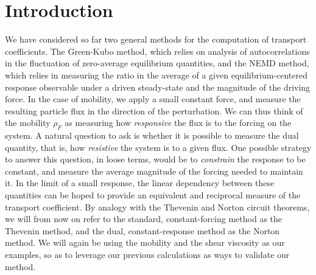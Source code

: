 \section{Introduction}
We have considered so far two general methods for the computation of transport coefficients. The Green-Kubo method, which relies on analysis of autocorrelations in the fluctuation of zero-average equilibrium quantities, 
and the NEMD method, which relies in measuring the ratio in the average of a given equilibrium-centered response observable under a driven steady-state and the magnitude of the driving force.
In the case of mobility, we apply a small constant force, and measure the resulting particle flux in the direction of the perturbation. We can thus think of the mobility $\rho_F$ as measuring how \textit{responsive} the flux is to the forcing on the system.
A natural question to ask is whether it is possible to measure the dual quantity, that is, how \textit{resistive} the system is to a given flux. One possible strategy to answer this question, in loose terms, would be to \textit{constrain} the response to be constant, and measure the average magnitude of the forcing needed to maintain it.
In the limit of a small response, the linear dependency between these quantities can be hoped to provide an equivalent and reciprocal measure of the transport coefficient. By analogy with the Thevenin and Norton circuit theorems, we will from now on refer to the standard, constant-forcing method as the Thevenin method,
and the dual, constant-response method as the Norton method. We will again be using the mobility and the shear viscosity as our examples, so as to leverage our previous calculations as ways to validate our method.


